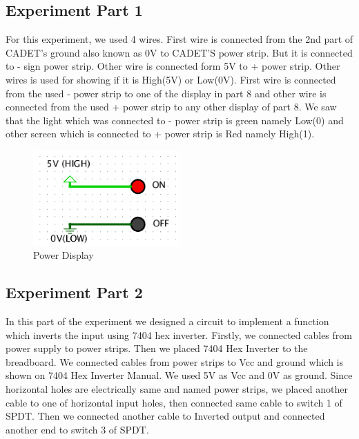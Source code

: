 \documentclass[pdftex,12pt,a4paper]{article}
\begin{document}
\newpage
\subsection{Experiment Part 1}
For this experiment, we used 4 wires. First wire is connected from the 2nd part of CADET’s ground also known as 0V to CADET’S power strip. But it is connected to - sign power strip. Other wire is connected form 5V to + power strip. Other wires is used for showing if it is High(5V) or Low(0V). First wire is connected from the used - power strip to one of the display in part 8 and other wire is connected from  the used + power strip to any other display of part 8. We saw that the light which was connected to - power strip is green namely Low(0) and other screen which is connected to + power strip is Red namely High(1).

\begin{figure}[ht]
	\centering
	\includegraphics[width=0.5\textwidth]{part1.png}
	\caption{Power Display}
	\label{fig0}
	
\end{figure}

\subsection{Experiment Part 2}
In this part of the experiment we designed a circuit to implement a function which inverts the input using 7404 hex inverter. Firstly, we connected cables from power supply to power strips. Then we placed 7404 Hex Inverter to the breadboard. We connected cables from power strips to Vcc and ground which is shown on 7404 Hex Inverter Manual. We used 5V as Vcc and 0V as ground. Since horizontal holes are electrically same and named power strips, we placed another cable to one of horizontal input holes, then connected same cable to switch 1 of SPDT. Then we connected another cable to Inverted output and connected another end to switch 3 of SPDT. 
\end{document}
